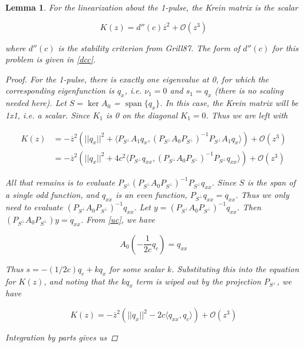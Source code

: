 \documentclass[12pt]{article}
\DeclareMathOperator{\spn}{span}
\newtheorem{lemma}{Lemma}
\begin{document}
\begin{lemma}\label{Krein1pulse}
For the linearization about the 1-pulse, the Krein matrix is the scalar

\begin{equation}
K(z) = d''(c) \overline{z}^2 + \mathcal{O}(z^3)
\end{equation}

where $d''(c)$ is the stability criterion from Grill87. The form of $d''(c)$ for this problem is given in \eqref{dcc}.

\begin{proof}

For the 1-pulse, there is exactly one eigenvalue at 0, for which the corresponding eigenfunction is $q_x$, i.e. $\nu_1 = 0$ and $s_1 = q_x$ (there is no scaling needed here). Let $S = \ker A_0$ = $\spn \{q_x\}$. In this case, the Krein matrix will be 1x1, i.e. a scalar. Since $K_1$ is 0 on the diagonal $K_1 = 0$. Thus we are left with

\begin{align*}
K(z) &= -\overline{z}^2 \left( ||q_x||^2 + \langle P_{S^\perp} A_1 q_x, (P_{S^\perp} A_0 P_{S^\perp})^{-1} P_{S^\perp} A_1 q_x \rangle \right) + \mathcal{O}(z^3) \\
&= -\overline{z}^2 \left( ||q_x||^2 + 4 c^2 \langle P_{S^\perp} q_{xx}, (P_{S^\perp} A_0 P_{S^\perp})^{-1} P_{S^\perp} q_{xx} \rangle \right) + \mathcal{O}(z^3)
\end{align*}

All that remains is to evaluate $P_{S^\perp} (P_{S^\perp} A_0 P_{S^\perp})^{-1} P_{S^\perp} q_{xx}$. Since $S$ is the span of a single odd function, and $q_{xx}$ is an even function, $P_{S^\perp} q_{xx} = q_{xx}$. Thus we only need to evaluate $(P_{S^\perp} A_0 P_{S^\perp})^{-1} q_{xx}$. Let $y = (P_{S^\perp} A_0 P_{S^\perp})^{-1} q_{xx}$. Then $(P_{S^\perp} A_0 P_{S^\perp})y = q_{xx}$. From \eqref{uc}, we have

\begin{equation*}\label{uc}
A_0 \left( -\frac{1}{2c} q_c \right) = q_{xx}
\end{equation*}

Thus $s = -(1/2c) q_c + k q_x$ for some scalar $k$. Substituting this into the equation for $K(z)$, and noting that the $k q_x$ term is wiped out by the projection $P_{S^\perp}$, we have

\[
K(z) = -\overline{z}^2 \left( ||q_x||^2 - 2c \langle q_{xx}, q_c \rangle \right) + \mathcal{O}(z^3)
\]

Integration by parts gives us


\end{proof}
\end{lemma}
\end{document}
